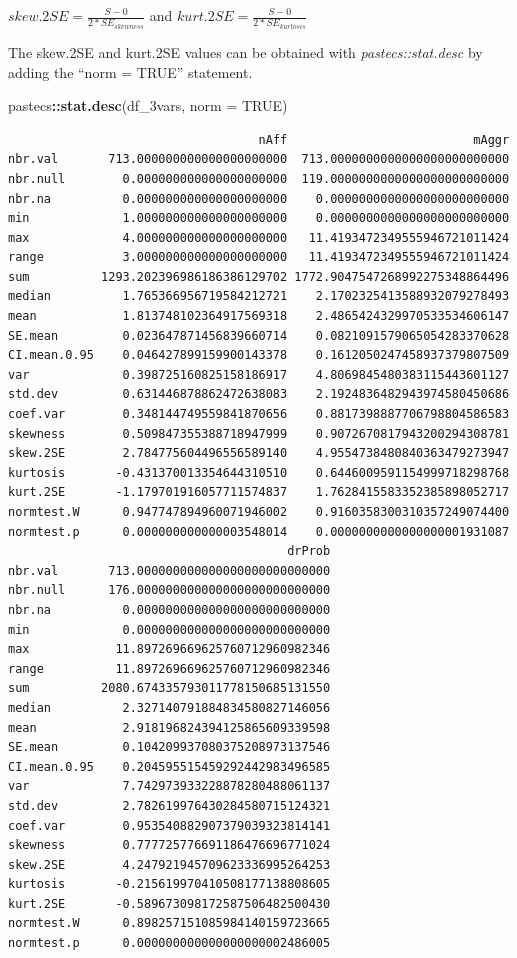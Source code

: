 \documentclass[
  11pt,
]{book}
\newenvironment{Shaded}{\begin{snugshade}}{\end{snugshade}}
\newcommand{\AttributeTok}[1]{\textcolor[rgb]{0.27,0.27,0.27}{#1}}
\newcommand{\ConstantTok}[1]{\textcolor[rgb]{0.37,0.37,0.37}{#1}}
\newcommand{\FunctionTok}[1]{\textcolor[rgb]{0.27,0.27,0.27}{\textbf{#1}}}
\newcommand{\NormalTok}[1]{#1}
\newcommand{\SpecialCharTok}[1]{\textcolor[rgb]{0.43,0.43,0.43}{\textbf{#1}}}
\begin{document}
\(skew.2SE = \frac{S-0}{2*SE_{skewness}}\) and \(kurt.2SE = \frac{S-0}{2*SE_{kurtosis}}\)

The skew.2SE and kurt.2SE values can be obtained with \emph{pastecs::stat.desc} by adding the ``norm = TRUE'' statement.

\begin{Shaded}
\begin{Highlighting}[]
\NormalTok{pastecs}\SpecialCharTok{::}\FunctionTok{stat.desc}\NormalTok{(df\_3vars, }\AttributeTok{norm =} \ConstantTok{TRUE}\NormalTok{)}
\end{Highlighting}
\end{Shaded}

\begin{verbatim}
                                   nAff                          mAggr
nbr.val       713.000000000000000000000  713.0000000000000000000000000
nbr.null        0.000000000000000000000  119.0000000000000000000000000
nbr.na          0.000000000000000000000    0.0000000000000000000000000
min             1.000000000000000000000    0.0000000000000000000000000
max             4.000000000000000000000   11.4193472349555946721011424
range           3.000000000000000000000   11.4193472349555946721011424
sum          1293.202396986186386129702 1772.9047547268992275348864496
median          1.765366956719584212721    2.1702325413588932079278493
mean            1.813748102364917569318    2.4865424329970533534606147
SE.mean         0.023647871456839660714    0.0821091579065054283370628
CI.mean.0.95    0.046427899159900143378    0.1612050247458937379807509
var             0.398725160825158186917    4.8069845480383115443601127
std.dev         0.631446878862472638083    2.1924836482943974580450686
coef.var        0.348144749559841870656    0.8817398887706798804586583
skewness        0.509847355388718947999    0.9072670817943200294308781
skew.2SE        2.784775604496556589140    4.9554738480840363479273947
kurtosis       -0.431370013354644310510    0.6446009591154999718298768
kurt.2SE       -1.179701916057711574837    1.7628415583352385898052717
normtest.W      0.947747894960071946002    0.9160358300310357249074400
normtest.p      0.000000000000003548014    0.0000000000000000001931087
                                       drProb
nbr.val       713.000000000000000000000000000
nbr.null      176.000000000000000000000000000
nbr.na          0.000000000000000000000000000
min             0.000000000000000000000000000
max            11.897269669625760712960982346
range          11.897269669625760712960982346
sum          2080.674335793011778150685131550
median          2.327140791884834580827146056
mean            2.918196824394125865609339598
SE.mean         0.104209937080375208973137546
CI.mean.0.95    0.204595515459292442983496585
var             7.742973933228878280488061137
std.dev         2.782619976430284580715124321
coef.var        0.953540882907379039323814141
skewness        0.777725776691186476696771024
skew.2SE        4.247921945709623336995264253
kurtosis       -0.215619970410508177138808605
kurt.2SE       -0.589673098172587506482500430
normtest.W      0.898257151085984140159723665
normtest.p      0.000000000000000000002486005
\end{verbatim}
\end{document}
